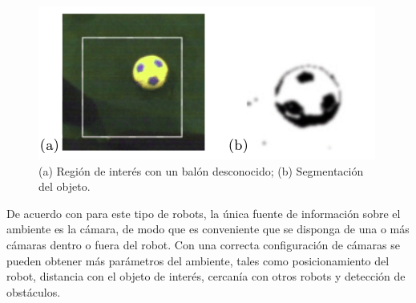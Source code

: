 \begin{figure}
\centering
\includegraphics[scale=0.7]{images/ball_contour_1.png}
\caption{(a) Región de interés con un balón desconocido; (b) Segmentación del objeto.}
\label{fig:ball_contour_1}
\end{figure}

	De acuerdo con \citep{behnke2006see} para este tipo de robots, la única fuente de información sobre el ambiente es la cámara, de modo que es conveniente que se disponga de una o más cámaras dentro o fuera del robot. Con una correcta configuración de cámaras se pueden obtener más parámetros del ambiente, tales como posicionamiento del robot, distancia con el objeto de interés, cercanía con otros robots y detección de obstáculos. 
	
	
	
	
	
	
	
	